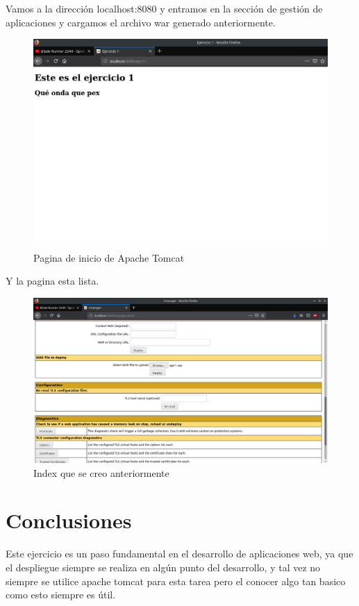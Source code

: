 \documentclass[a4paper,12pt]{article}
\begin{document}
Vamos a la dirección localhost:8080 y entramos en la sección de gestión de 
aplicaciones y cargamos el archivo war generado anteriormente.

\begin{figure}[H]
\begin{center}
 \includegraphics[width=12cm]{localhost.png}
 \caption{Pagina de inicio de Apache Tomcat}
 \label{fig:localhost}
\end{center}
\end{figure}

Y la pagina esta lista.

\begin{figure}[H]
\begin{center}
 \includegraphics[width=12cm]{pagina.png}
 \caption{Index que se creo anteriormente}
 \label{fig:index}
\end{center}
\end{figure}

\section{Conclusiones}
Este ejercicio es un paso fundamental en el desarrollo de aplicaciones web, ya 
que el despliegue siempre se realiza en algún punto del desarrollo, y tal vez 
no siempre se utilice apache tomcat para esta tarea pero el conocer algo tan 
basico como esto siempre es útil.
\end{document}
